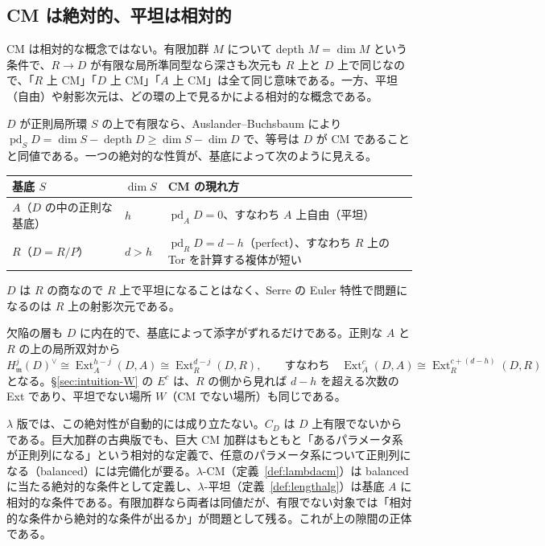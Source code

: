 \documentclass[11pt,a4paper]{ltjsarticle}
\numberwithin{equation}{section}
\theoremstyle{plain}
\theoremstyle{definition}
\theoremstyle{definition}
\newcommand{\m}{\mathfrak{m}}
\providecommand{\Ext}{\operatorname{Ext}}
\begin{document}
\subsection{CM は絶対的、平坦は相対的}\label{sec:lflat-absolute}

CM は相対的な概念ではない。有限加群 $M$ について depth $M = \dim M$ という条件で、$R\to D$ が有限な局所準同型なら深さも次元も $R$ 上と $D$ 上で同じなので、「$R$ 上 CM」「$D$ 上 CM」「$A$ 上 CM」は全て同じ意味である。一方、平坦（自由）や射影次元は、どの環の上で見るかによる相対的な概念である。

$D$ が正則局所環 $S$ の上で有限なら、Auslander--Buchsbaum により $\operatorname{pd}_S D = \dim S - \operatorname{depth}D\ge\dim S-\dim D$ で、等号は $D$ が CM であることと同値である。一つの絶対的な性質が、基底によって次のように見える。
\begin{center}
\small
\begin{tabularx}{\textwidth}{>{\raggedright}p{4.2cm}>{\raggedright}p{1.4cm}>{\raggedright\arraybackslash}X}
\toprule
基底 $S$ & $\dim S$ & CM の現れ方 \\
\midrule
$A$（$D$ の中の正則な基底） & $h$ & $\operatorname{pd}_A D = 0$、すなわち $A$ 上自由（平坦） \\
$R$（$D = R/P$） & $d>h$ & $\operatorname{pd}_R D = d-h$（perfect）、すなわち $R$ 上の Tor を計算する複体が短い \\
\bottomrule
\end{tabularx}
\end{center}
$D$ は $R$ の商なので $R$ 上で平坦になることはなく、Serre の Euler 特性で問題になるのは $R$ 上の射影次元である。

欠陥の層も $D$ に内在的で、基底によって添字がずれるだけである。正則な $A$ と $R$ の上の局所双対から
\[
  H^j_\m(D)^\vee\cong\Ext^{h-j}_A(D,A)\cong\Ext^{d-j}_R(D,R),\qquad\text{すなわち}\quad \Ext^c_A(D,A)\cong\Ext^{c+(d-h)}_R(D,R)
\]
となる。\S\ref{sec:intuition-W} の $E^c$ は、$R$ の側から見れば $d-h$ を超える次数の Ext であり、平坦でない場所 $W$（CM でない場所）も同じである。

$\lambda$ 版では、この絶対性が自動的には成り立たない。$C_D$ は $D$ 上有限でないからである。巨大加群の古典版でも、巨大 CM 加群はもともと「あるパラメータ系が正則列になる」という相対的な定義で、任意のパラメータ系について正則列になる（balanced）には完備化が要る。$\lambda$-CM（定義~\ref{def:lambdacm}）は balanced に当たる絶対的な条件として定義し、$\lambda$-平坦（定義~\ref{def:lengthalg}）は基底 $A$ に相対的な条件である。有限加群なら両者は同値だが、有限でない対象では「相対的な条件から絶対的な条件が出るか」が問題として残る。これが上の隙間の正体である。
\end{document}
